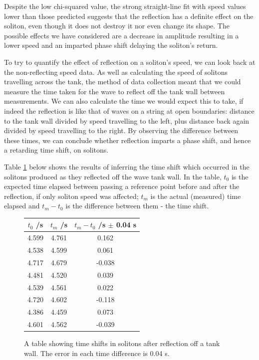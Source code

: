 \documentclass[10pt, twocolumn]{revtex4}    %
\begin{document}
Despite the low chi-squared value, the strong straight-line fit with speed values lower than those predicted suggests that the reflection has a definite effect on the soliton, even though it does not destroy it nor even change its shape. The possible effects we have considered are a decrease in amplitude resulting in a lower speed and an imparted phase shift delaying the soliton’s return. 

To try to quantify the effect of reflection on a soliton's speed, we can look back at the non-reflecting speed data. As well as calculating the speed of solitons travelling across the tank, the method of data collection meant that we could measure the time taken for the wave to reflect off the tank wall between measurements. We can also calculate the time we would expect this to take, if indeed the reflection is like that of waves on a string at open boundaries: distance to the tank wall divided by speed travelling to the left, plus distance back again divided by speed travelling to the right. By observing the difference between these times, we can conclude whether reflection imparts a phase shift, and hence a retarding time shift, on solitons. 

Table \ref{Table} below shows the results of inferring the time shift which occurred in the solitons produced as they reflected off the wave tank wall. In the table, $t_0$ is the expected time elapsed between passing a reference point before and after the reflection, if only soliton speed was affected; $t_m$ is the actual (measured) time elapsed and $t_m - t_0$ is the difference between them - the time shift. 

\begin{figure}[h!]
\begin{tabular}{| c | c | c |} %
\hline
$t_0$ /s & $t_m$ /s & $t_m - t_0$ /s $\pm$ 0.04 s \\ \hline
4.599	& 4.761 		& 0.162 \\ \hline
4.538	& 4.599 		& 0.061 \\ \hline
4.717	& 4.679		& -0.038 \\ \hline
4.481	& 4.520		& 0.039 \\ \hline
4.539	& 4.561		& 0.022 \\ \hline
4.720	& 4.602		& -0.118 \\ \hline
4.386	& 4.459		& 0.073 \\ \hline
4.601	& 4.562		& -0.039 \\
\hline
\end{tabular}
\caption{A table showing time shifts in solitons after reflection off a tank wall. The error in each time difference is 0.04 s.}
\label{Table}
\end{figure}
\end{document}
